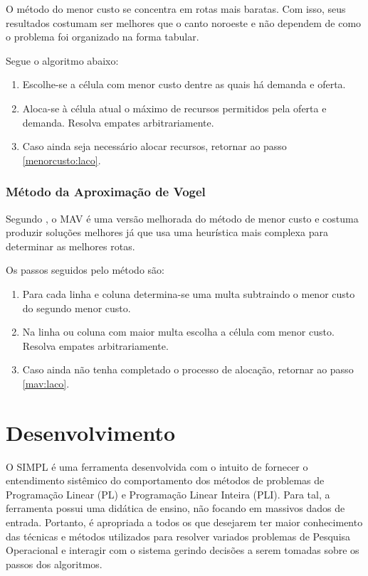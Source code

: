 \documentclass [11pt]{articleSBPO}
\begin{document}
O método do menor custo se concentra em rotas mais baratas. Com isso, seus resultados costumam ser melhores que o canto noroeste e não dependem de como o problema foi organizado na forma tabular.

Segue o algoritmo abaixo:

\begin{enumerate}
	\item Escolhe-se a célula com menor custo dentre as quais há demanda e oferta. \label{menorcusto:laco}
	\item Aloca-se à célula atual o máximo de recursos permitidos pela oferta e demanda. Resolva empates arbitrariamente.
	\item Caso ainda seja necessário alocar recursos, retornar ao passo \ref{menorcusto:laco}.
\end{enumerate}

\subsubsection{Método da Aproximação de Vogel}\label{subsubsec:mav}

Segundo \cite{taha}, o MAV é uma versão melhorada do método de menor custo e costuma produzir soluções melhores já que usa uma heurística mais complexa para determinar as melhores rotas.

Os passos seguidos pelo método são:

\begin{enumerate}
	\item Para cada linha e coluna determina-se uma multa subtraindo o menor custo do segundo menor custo. \label{mav:laco}
	\item Na linha ou coluna com maior multa escolha a célula com menor custo. Resolva empates arbitrariamente.
	\item Caso ainda não tenha completado o processo de alocação, retornar ao passo \ref{mav:laco}.
\end{enumerate}


\section{Desenvolvimento}\label{sec:desenvolvimento}

O SIMPL é uma ferramenta desenvolvida com o intuito de fornecer o entendimento sistêmico do comportamento dos métodos de problemas de Programação Linear (PL) e Programação Linear Inteira (PLI). Para tal, a ferramenta possui uma didática de ensino, não focando em massivos dados de entrada. Portanto, é apropriada a todos os que desejarem ter maior conhecimento das técnicas e métodos utilizados para resolver variados problemas de Pesquisa Operacional e interagir com o sistema gerindo decisões a serem tomadas sobre os passos dos algoritmos.
\end{document}
